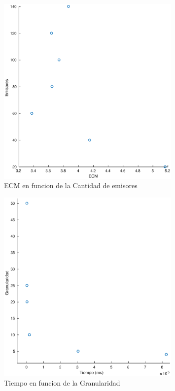 \begin{figure}[H]
	\centering	\includegraphics[width=0.8\textwidth]{img/emi_ecm}
	\caption{ECM en funcion de la Cantidad de emisores}
	\label{fig:etiqueta}
\end{figure}


\begin{figure}[H]
	\centering	\includegraphics[width=0.8\textwidth]{img/granu_tiempo}
	\caption{Tiempo en funcion de la Granularidad}
	\label{fig:etiqueta}
\end{figure}


